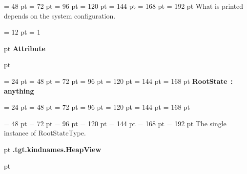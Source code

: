 {{{{\par \noindent  \leftskip = 48 pt  \leftmargini = 72 pt  \leftmarginii = 96 pt  \leftmarginiii = 120 pt  \leftmarginiv = 144 pt  \leftmarginv = 168 pt  \leftmarginvi = 192 pt  What is printed depends on the system configuration.
\par}
\par}
\par}
{\par \pagebreak[3.300000] \noindent \hangindent = 12 pt \hangafter = 1 
{\par \pagebreak[3]  pt \noindent
{\Large {\bf Attribute\/}}\par {} pt
} \noindent
\par}
{\par \noindent  \leftskip = 24 pt  \leftmargini = 48 pt  \leftmarginii = 72 pt  \leftmarginiii = 96 pt  \leftmarginiv = 120 pt  \leftmarginv = 144 pt  \leftmarginvi = 168 pt {\bf {\large {\bf RootState\/}}\/}~{\bf :} {\bf  anything\/}\par}
{\par \noindent  \leftskip = 24 pt  \leftmargini = 48 pt  \leftmarginii = 72 pt  \leftmarginiii = 96 pt  \leftmarginiv = 120 pt  \leftmarginv = 144 pt  \leftmarginvi = 168 pt {\par \noindent
{\par \noindent  \leftskip = 48 pt  \leftmargini = 72 pt  \leftmarginii = 96 pt  \leftmarginiii = 120 pt  \leftmarginiv = 144 pt  \leftmarginv = 168 pt  \leftmarginvi = 192 pt  The single instance of RootStateType.
\par}
\par}
\par}
\par}
{\par \pagebreak[3]  pt \noindent
{\LARGE {\bf .tgt.kindnames.HeapView\/}}\par {} pt
} \noindent
